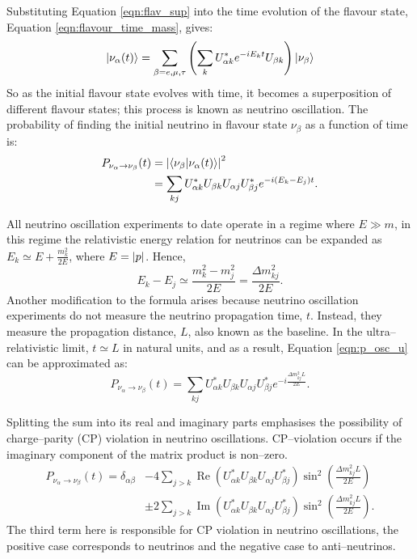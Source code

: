 Substituting Equation \ref{eqn:flav_sup} into the time evolution of the flavour
state, Equation \ref{eqn:flavour_time_mass}, gives:
\begin{equation*}
	\ket{\nu_\alpha(t)} = \sum_{\beta = e, \mu, \tau} \left(\sum_k
	U^*_{\alpha k} e^{-iE_kt} U_{\beta k} \right) \ket{\nu_{\beta}} 
\end{equation*}
So as the initial flavour state evolves with time, it becomes a superposition 
of different flavour states; this process is known as neutrino oscillation.
The probability of finding the initial neutrino in flavour state \(\nu_\beta\) 
as a function of time is:
\begin{align}
	\label{eqn:p_osc_u}
	P_{\nu_\alpha \rightarrow \nu_\beta}(t) &= \abs{\braket{\nu_\beta}{\nu_\alpha(t)}}^2 \nonumber \\
	                                        &= \sum_{kj} U^*_{\alpha k} U_{\beta k} U_{\alpha j} U^*_{\beta j} e^{-i(E_k - E_j)t}.
\end{align}

\noindent
All neutrino oscillation experiments to date operate in a regime where 
\(E \gg m\), in this regime the relativistic energy relation for neutrinos can 
be expanded as \({E_k \simeq E + \frac{m_k^2}{2E}}\), where \(E = \abs{p}\). 
Hence, 
\begin{equation*}
	E_k - E_j \simeq \frac{m_k^2 - m_j^2}{2E} = \frac{\Delta m_{kj}^2}{2E}.
\end{equation*}
Another modification to the formula arises because neutrino oscillation 
experiments do not measure the neutrino propagation time, \(t\). Instead, 
they measure the propagation distance, \(L\), also known as the baseline. In the
ultra--relativistic limit, \({t \simeq L}\) in natural units, and as a result, 
Equation \ref{eqn:p_osc_u} can be approximated as:
\begin{equation*}
	P_{\nu_\alpha \rightarrow \nu_\beta}(t) = \sum_{kj} U^*_{\alpha k} U_{\beta k} U_{\alpha j} U^*_{\beta j} e^{-i\frac{\Delta m^2_{kj}L}{2E}}.
\end{equation*}

\noindent
Splitting the sum into its real and imaginary parts emphasises the possibility
of charge--parity (CP) violation in neutrino oscillations. CP--violation occurs if the imaginary
component of the matrix product is non--zero. 
\begin{align*}
	P_{\nu_\alpha \rightarrow \nu_\beta}(t) = \delta_{\alpha \beta} 
	&- 4 \sum_{j > k} \operatorname{Re}(U^*_{\alpha k} U_{\beta k} U_{\alpha j} U^*_{\beta j}) \sin^2(\frac{\Delta m^2_{kj} L}{2E}) \nonumber \\
	&\pm 2 \sum_{j > k} \operatorname{Im}(U^*_{\alpha k} U_{\beta k} U_{\alpha j} U^*_{\beta j}) \sin^2(\frac{\Delta m^2_{kj} L}{2E}).
\end{align*}
The third term here is responsible for CP violation in neutrino oscillations,
the positive case corresponds to neutrinos and the negative case to
anti--neutrinos.

